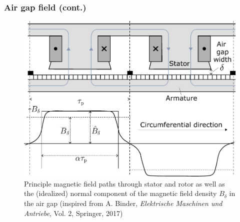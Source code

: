 \begin{frame}
	\frametitle{Air gap field (cont.)}
    \begin{figure}
        \centering
        \includegraphics[height=0.67\textheight]{fig/lec03/Magnetic_field_normal_component_DC_machine.pdf}
        \caption{Principle magnetic field paths through stator and rotor as well as the (idealized) normal component of the magnetic field density $B_\delta$ in the air gap  (inspired from A. Binder, \textit{Elektrische Maschinen und Antriebe}, Vol. 2, Springer, 2017)}
		\label{fig:Magnetic_field_normal_component_DC_machine}
    \end{figure}
\end{frame}

